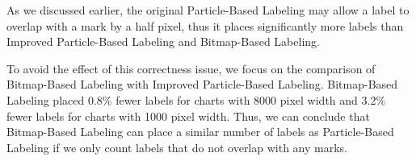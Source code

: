 As we discussed earlier, the original Particle-Based Labeling may allow a label
to overlap with a mark by a half pixel, thus it places significantly more labels than 
Improved Particle-Based Labeling and Bitmap-Based Labeling.

To avoid the effect of this correctness issue, we focus on the comparison of Bitmap-Based Labeling 
with Improved Particle-Based Labeling. 
Bitmap-Based Labeling placed 0.8\% fewer labels for charts with 8000 pixel width 
and 3.2\% fewer labels for charts with 1000 pixel width.
Thus, we can conclude that Bitmap-Based Labeling can place a similar number of labels as Particle-Based Labeling if we only count labels that do not overlap with any marks.
